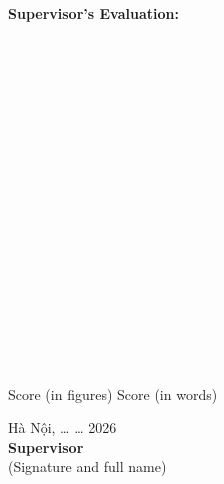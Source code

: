 \documentclass[12pt,a4paper]{article}
\begin{document}
\newpage
\begin{center}
    \textbf{Supervisor's Evaluation:}
\end{center}

\vspace{0.2cm}

\noindent\makebox[\linewidth]{\dotfill}\\[0.2cm]
\noindent\makebox[\linewidth]{\dotfill}\\[0.2cm]
\noindent\makebox[\linewidth]{\dotfill}\\[0.2cm]
\noindent\makebox[\linewidth]{\dotfill}\\[0.2cm]
\noindent\makebox[\linewidth]{\dotfill}\\[0.2cm]
\noindent\makebox[\linewidth]{\dotfill}\\[0.2cm]
\noindent\makebox[\linewidth]{\dotfill}\\[0.2cm]
\noindent\makebox[\linewidth]{\dotfill}\\[0.2cm]
\noindent\makebox[\linewidth]{\dotfill}\\[0.2cm]
\noindent\makebox[\linewidth]{\dotfill}\\[0.2cm]
\noindent\makebox[\linewidth]{\dotfill}\\[0.2cm]
\noindent\makebox[\linewidth]{\dotfill}\\[0.2cm]
\noindent\makebox[\linewidth]{\dotfill}\\[0.2cm]
\noindent\makebox[\linewidth]{\dotfill}\\[0.2cm]
\noindent\makebox[\linewidth]{\dotfill}\\[0.2cm]
\noindent\makebox[\linewidth]{\dotfill}\\[0.2cm]
\noindent\makebox[\linewidth]{\dotfill}\\[0.2cm]
\noindent\makebox[\linewidth]{\dotfill}

\noindent\hspace{3cm} Score (in figures) \dotfill{} Score (in words) \dotfill

\vspace{1.5cm}

\begin{center}
    Hà Nội, \ldots{} \ldots{} 2026\\[0.2cm]
    \textbf{Supervisor}\\[0.1cm]
    (Signature and full name)
\end{center}
\end{document}
